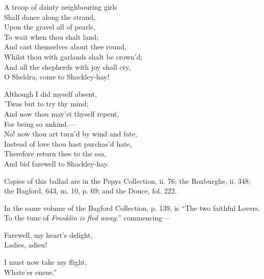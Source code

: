\begin{dcverse}
\begin{patverse}
A troop of dainty neighbouring girls\\
Shall dance along the strand,\\
Upon the gravel all of pearls,\\
To wait when thou shalt land;\\
And cast themselves about thee round,\\
Whilst thou with garlands shalt be crown’d;\\
And all the shepherds with joy shall cry,\\
O Sheldra, come to Shackley-hay!
\end{patverse}

\begin{patverse}
Although I did myself absent,\\
’Twas but to try thy mind;\\
And now thou may’st thyself repent,\\
For being so unkind.—\\
No! now thou art turn’d by wind and fate,\\
Instead of love thou hast purchas’d hate,\\
Therefore return thee to the sea,\\
And bid farewell to Shackley-hay.
\end{patverse}
\end{dcverse}


Copies of this ballad are in the Pepys Collection, ii. 76; the Roxburghe,
ii. 348; the Bagford, 643, m. 10, p. 69; and the Douce, fol. 222.

In the same volume of the Bagford Collection, p. 139, is “The two faithful
Lovers. To the tune of \textit{Franklin is fled away};” commencing—
\settowidth{\versewidth}{Farewell, my heart’s delight,}
\begin{dcverse}\begin{patverse}
Farewell, my heart’s delight,\\
Ladies, adieu!
\end{patverse}

\begin{patverse}
I must now take my flight,\\
Whate’er ensue.”
\end{patverse}
\end{dcverse}

